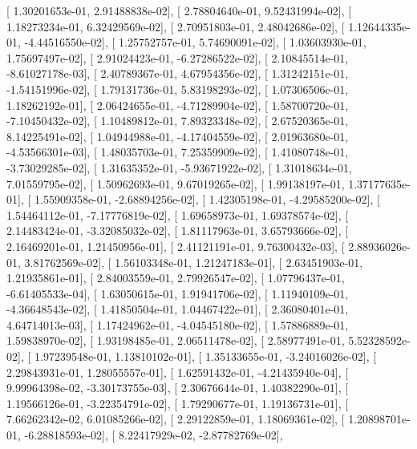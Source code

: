 \documentclass{article}
\begin{document}
       [  1.30201653e-01,   2.91488838e-02],
       [  2.78804640e-01,   9.52431994e-02],
       [  1.18273234e-01,   6.32429569e-02],
       [  2.70951803e-01,   2.48042686e-02],
       [  1.12644335e-01,  -4.44516550e-02],
       [  1.25752757e-01,   5.74690091e-02],
       [  1.03603930e-01,   1.75697497e-02],
       [  2.91024423e-01,  -6.27286522e-02],
       [  2.10845514e-01,  -8.61027178e-03],
       [  2.40789367e-01,   4.67954356e-02],
       [  1.31242151e-01,  -1.54151996e-02],
       [  1.79131736e-01,   5.83198293e-02],
       [  1.07306506e-01,   1.18262192e-01],
       [  2.06424655e-01,  -4.71289904e-02],
       [  1.58700720e-01,  -7.10450432e-02],
       [  1.10489812e-01,   7.89323348e-02],
       [  2.67520365e-01,   8.14225491e-02],
       [  1.04944988e-01,  -4.17404559e-02],
       [  2.01963680e-01,  -4.53566301e-03],
       [  1.48035703e-01,   7.25359909e-02],
       [  1.41080748e-01,  -3.73029285e-02],
       [  1.31635352e-01,  -5.93671922e-02],
       [  1.31018634e-01,   7.01559795e-02],
       [  1.50962693e-01,   9.67019265e-02],
       [  1.99138197e-01,   1.37177635e-01],
       [  1.55909358e-01,  -2.68894256e-02],
       [  1.42305198e-01,  -4.29585200e-02],
       [  1.54464112e-01,  -7.17776819e-02],
       [  1.69658973e-01,   1.69378574e-02],
       [  2.14483424e-01,  -3.32085032e-02],
       [  1.81117963e-01,   3.65793666e-02],
       [  2.16469201e-01,   1.21450956e-01],
       [  2.41121191e-01,   9.76300432e-03],
       [  2.88936026e-01,   3.81762569e-02],
       [  1.56103348e-01,   1.21247183e-01],
       [  2.63451903e-01,   1.21935861e-01],
       [  2.84003559e-01,   2.79926547e-02],
       [  1.07796437e-01,  -6.61405533e-04],
       [  1.63050615e-01,   1.91941706e-02],
       [  1.11940109e-01,  -4.36648543e-02],
       [  1.41850504e-01,   1.04467422e-01],
       [  2.36080401e-01,   4.64714013e-03],
       [  1.17424962e-01,  -4.04545180e-02],
       [  1.57886889e-01,   1.59838970e-02],
       [  1.93198485e-01,   2.06511478e-02],
       [  2.58977491e-01,   5.52328592e-02],
       [  1.97239548e-01,   1.13810102e-01],
       [  1.35133655e-01,  -3.24016026e-02],
       [  2.29843931e-01,   1.28055557e-01],
       [  1.62591432e-01,  -4.21435940e-04],
       [  9.99964398e-02,  -3.30173755e-03],
       [  2.30676644e-01,   1.40382290e-01],
       [  1.19566126e-01,  -3.22354791e-02],
       [  1.79290677e-01,   1.19136731e-01],
       [  7.66262342e-02,   6.01085266e-02],
       [  2.29122859e-01,   1.18069361e-02],
       [  1.20898701e-01,  -6.28818593e-02],
       [  8.22417929e-02,  -2.87782769e-02],
\end{document}
